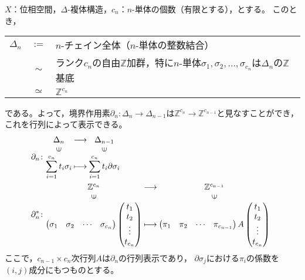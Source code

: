 \documentclass[uplatex]{jsarticle}
\begin{document}
\sukima {}

$X$：位相空間，$\Delta$-複体構造，$c_{n}$：$n$-単体の個数（有限とする），とする。
このとき，
\begin{center}
  \begin{tabular}{l@{\,}c@{\,}l}
    $\Delta_{n}$ & $:=$ & $n$-チェイン全体（$n$-単体の整数結合） \\
    & $\sim$ & ランク$c_{n}$の自由$\mathbb{Z}$加群，特に$n$-単体$\sigma_{1},\sigma_{2}, \dots, \sigma_{c_{n}}$は$\Delta_{n}$の$\mathbb{Z}$基底 \\
    & $\simeq$ & $\mathbb{Z}^{c_{n}}$
  \end{tabular}
\end{center}
である。よって，境界作用素$\partial_{n} \colon \Delta_{n} \longrightarrow \Delta_{n-1}$は$\mathbb{Z}^{c_{n}} \longrightarrow \mathbb{Z}^{c_{n-1}}$と見なすことができ，
これを行列によって表示できる。
\begin{align}
  & \partial_{n} \colon \mapdef{\Delta_{n}}{\Delta_{n-1}}{\displaystyle \sum_{i=1}^{c_{n}} t_{i} \sigma_{i}}{\displaystyle \sum_{i=1}^{c_{n}} t_{i} \partial \sigma_{i}} \\
  & \partial_{n}^{*} \colon \mapdef{\mathbb{Z}^{c_{n}}}{\mathbb{Z}^{c_{n-1}}}{
    \begin{pmatrix}
      \sigma_{1} & \sigma_{2} & \cdots & \sigma_{c_{n}}
    \end{pmatrix}
    \begin{pmatrix}
      t_{1} \\ t_{2} \\ \vdots \\ t_{c_{n}}
    \end{pmatrix}
  }{
    \begin{pmatrix}
      \pi_{1} & \pi_{2} & \cdots & \pi_{c_{n-1}}
    \end{pmatrix} A
    \begin{pmatrix}
      t_{1} \\ t_{2} \\ \vdots \\ t_{c_{n}}
    \end{pmatrix}
  }
\end{align}
ここで，$c_{n-1} \times c_{n}$次行列$A$は$\partial_{n}$の行列表示であり，
$\partial \sigma_{j}$における$\pi_{i}$の係数を$(i,j)$成分にもつものとする。
\end{document}
